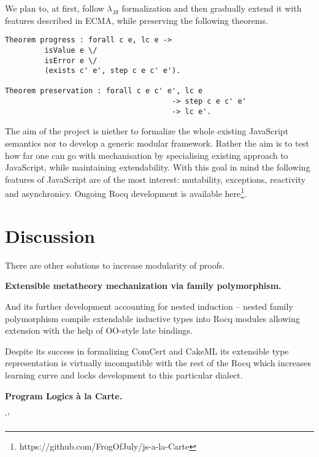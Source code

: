 \documentclass[sigplan,nonacm]{acmart}
\begin{document}
We plan to, at first, follow $\lambda_{\texttt{JS}}$\cite{guha2010essence} formalization and then gradually extend it with features described in ECMA, while preserving the following theorems.

\begin{lstlisting}[numbers=none, language=Coq]
Theorem progress : forall c e, lc e -> 
         isValue e \/ 
         isError e \/ 
         (exists c' e', step c e c' e').

Theorem preservation : forall c e c' e', lc e
                                      -> step c e c' e'
                                      -> lc e'.
\end{lstlisting}

The aim of the project is niether to formalize the whole existing JavaScript semantics nor to develop a generic modular framework. 
Rather the aim is to test how far one can go with mechanisation by specialising existing approach to JavaScript, while maintaining extendability. 
With this goal in mind the following features of JavaScript are of the most interest: mutability, exceptions, reactivity and asynchronicy. 
Ongoing Rocq development is available here\footnote{https://github.com/FrogOfJuly/js-a-la-Carte}.


\section{Discussion}

There are other solutions to increase modularity of proofs. 

\medskip

\textbf{Extensible metatheory mechanization via family polymorphism. }

And its further development accounting for nested induction -- nested family polymorphism\cite{ebresafe2025certified} compile extendable inductive types into Rocq modules allowing extension with the help of 
OO-style late bindings. 

Despite its success in formalizing ComCert and CakeML its extensible type representation is virtually incompatible with the rest of the Rocq which increases learning curve and locks development to this particular dialect. 

\medskip
\textbf{Program Logics à la Carte.}

`'
\end{document}
